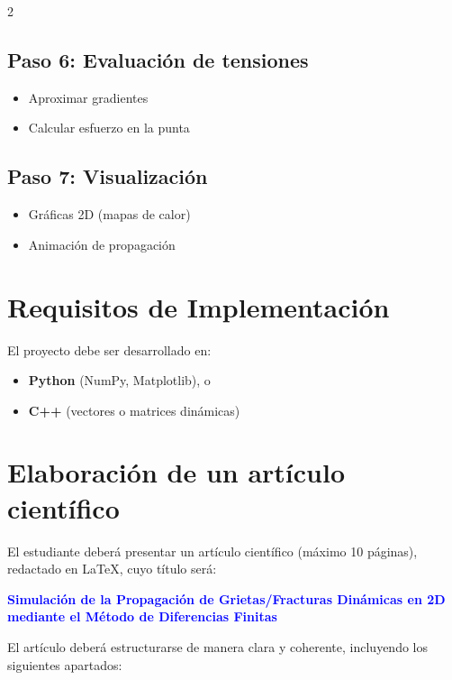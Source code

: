 \documentclass[a4paper,10pt]{exam}
\begin{document}
\begin{multicols}{2}
\subsection*{Paso 6: Evaluación de tensiones}
\begin{itemize}
\item Aproximar gradientes
\item Calcular esfuerzo en la punta
\end{itemize}

\subsection*{Paso 7: Visualización}
\begin{itemize}
\item Gráficas 2D (mapas de calor)
\item Animación de propagación
\end{itemize}
\end{multicols}

\section{Requisitos de Implementación}

El proyecto debe ser desarrollado en:

\begin{itemize}
\item \textbf{Python} (NumPy, Matplotlib), o
\item \textbf{C++} (vectores o matrices dinámicas)
\end{itemize}

\section{Elaboración de un artículo científico}

El estudiante deberá presentar un artículo científico (máximo 10 páginas), redactado en \LaTeX, cuyo título será:

\begin{center}
\Large\textcolor{blue}{\textbf{Simulación de la Propagación de Grietas/Fracturas Dinámicas en 2D mediante el Método de Diferencias Finitas}}
\end{center}

El artículo deberá estructurarse de manera clara y coherente, incluyendo los siguientes apartados:
\end{document}
